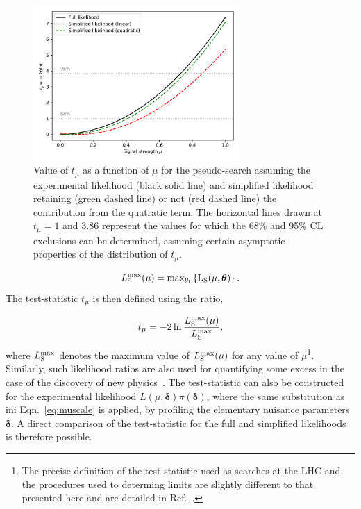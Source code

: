 \documentclass[11pt]{article}
\begin{document}
\begin{figure}[t]
  \centering
  \includegraphics[width=0.7\textwidth]{figures/testtoy-tmuscan}
  \caption{Value of $t_{\mu}$ as a function of $\mu$ for the pseudo-search assuming the experimental likelihood (black solid line) and simplified likelihood retaining (green dashed line) or not (red dashed line) the contribution from the quatratic term. The horizontal lines drawn at $t_{\mu}=1$ and $3.86$ represent the
  values for which the 68\% and 95\% CL exclusions can be determined, assuming certain asymptotic properties of the distribution of $t_{\mu}$.}
  \label{fig:tmucompare}
\end{figure}


\begin{equation}
L_{\rm{S}}^{\rm{max}}(\mu) = \rm{max}_{\theta_{I}}\left\{ L_{\rm{S}}(\mu,\bm{\theta}) \right\}.
\end{equation}
The test-statistic $t_{\mu}$ is then defined using the ratio,

\begin{equation}
t_{\mu} = -2\ln \frac{L_{\rm{S}}^{\rm{max}}(\mu)}{L_{\rm{S}}^{\rm{max}}},
\end{equation}
where $L_{\rm{S}}^{\rm{max}}$ denotes the maximum value of $L_{\rm{S}}^{\rm{max}}(\mu)$ for any value of $\mu$\footnote{The precise definition of the test-statistic used
as searches at the LHC and the procedures used to determing limits are slightly different to that presented here and are detailed in Ref.~\cite{CMS-NOTE-2011-005}.}.
Similarly, such likelihood ratios are also used for quantifying some excess in the case of the discovery
of new physics~\cite{CMS-NOTE-2011-005}.
The test-statistic can also be constructed for the experimental likelihood $L(\mu,\bm{\delta})\pi(\bm{\delta})$, where the same substitution as ini Eqn.~\ref{eq:muscale} is applied,
by profiling the elementary
nuisance parameters $\bm{\delta}$. A direct comparison of the test-statistic for the full and simplified likelihoods is therefore possible.
\end{document}
